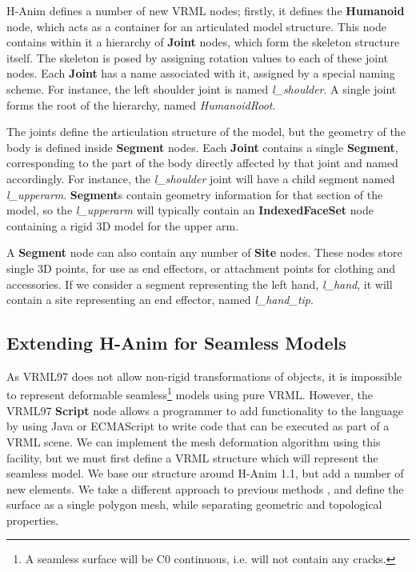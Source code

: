 H-Anim defines a number of new VRML nodes; firstly, it defines the {\bf Humanoid} node, which acts as a container for an articulated model structure. This node contains within it a hierarchy of {\bf Joint} nodes, which form the skeleton structure itself. The skeleton is posed by assigning rotation values to each of these joint nodes. Each {\bf Joint} has a name associated with it, assigned by a special naming scheme. For instance, the left shoulder joint is named {\it l\_shoulder}. A single joint forms the root of the hierarchy, named {\it HumanoidRoot}. 

The joints define the articulation structure of the model, but the geometry of the body is defined inside {\bf Segment} nodes. Each {\bf Joint} contains a single {\bf Segment}, corresponding to the part of the body directly affected by that joint and named accordingly. For instance, the {\it l\_shoulder} joint will have a child segment named {\it l\_upperarm}. {\bf Segment}s contain geometry information for that section of the model, so the {\it l\_upperarm} will typically contain an {\bf IndexedFaceSet} node containing a rigid 3D model for the upper arm.

A {\bf Segment} node can also contain any number of {\bf Site} nodes. These nodes store single 3D points, for use as end effectors, or attachment points for clothing and accessories. If we consider a segment representing the left hand, {\it l\_hand}, it will contain a site representing an end effector, named {\it l\_hand\_tip}.

\subsection{\label{sec:skeletalanim:vrml:extentions}Extending H-Anim for Seamless Models}
As VRML97 does not allow non-rigid transformations of objects, it is impossible to represent deformable seamless\footnote{A seamless surface will be C0 continuous, i.e. will not contain any cracks.} models using pure VRML. However, the VRML97 {\bf Script} node allows a programmer to add functionality to the language by using Java \cite{Gosling00} or ECMAScript \cite{ECMA99} to write code that can be executed as part of a VRML scene. We can implement the mesh deformation algorithm using this facility, but we must first define a VRML structure which will represent the seamless model. We base our structure around H-Anim 1.1, but add a number of new elements. We take a different approach to previous methods \cite{Babski99}, and define the surface as a single polygon mesh, while separating geometric and topological properties.

